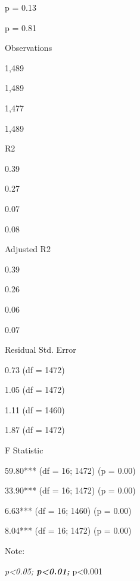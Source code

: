 \documentclass[
]{book}
\begin{document}
p = 0.13

p = 0.81

Observations

1,489

1,489

1,477

1,489

R2

0.39

0.27

0.07

0.08

Adjusted R2

0.39

0.26

0.06

0.07

Residual Std. Error

0.73 (df = 1472)

1.05 (df = 1472)

1.11 (df = 1460)

1.87 (df = 1472)

F Statistic

59.80*** (df = 16; 1472) (p = 0.00)

33.90*** (df = 16; 1472) (p = 0.00)

6.63*** (df = 16; 1460) (p = 0.00)

8.04*** (df = 16; 1472) (p = 0.00)

Note:

\emph{p\textless0.05; \textbf{p\textless0.01; }}p\textless0.001
\end{document}
